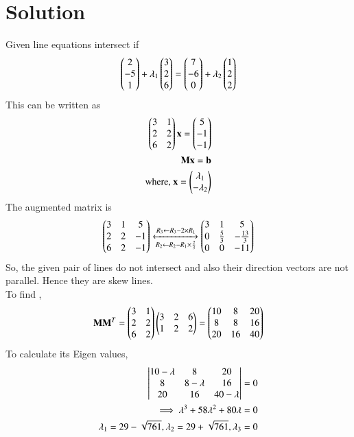 \documentclass[journal,12pt,twocolumn]{IEEEtran}
\begin{document}
\section{Solution}
Given line equations intersect if
\begin{align}
 \begin{pmatrix}2\\-5\\1\end{pmatrix}+\lambda_1\begin{pmatrix}3\\2\\6\end{pmatrix}=\begin{pmatrix}7\\-6\\0\end{pmatrix}+\lambda_2\begin{pmatrix}1\\2\\2\end{pmatrix}
\end{align}
This can be written as 
\begin{align}
    \begin{pmatrix}3&1\\2&2\\6&2\end{pmatrix}\mathbf{x}=\begin{pmatrix}5\\-1\\-1\end{pmatrix}\\
    \mathbf{M}\mathbf{x}=\mathbf{b}\\
    \text{where, }\mathbf{x}=\begin{pmatrix}\lambda_1\\-\lambda_2\end{pmatrix}
\end{align}
The augmented matrix is 
\begin{align}
    \begin{pmatrix}3&1&5\\2&2&-1\\6&2&-1\end{pmatrix}\xleftrightarrow[R_2\leftarrow R_2-R_1\times \frac{2}{3}]{R_3\leftarrow R_3-2\times R_1}\begin{pmatrix}3&1&5\\0&\frac{5}{3}&-\frac{13}{3}\\0&0&-11\end{pmatrix}
\end{align}
So, the given pair of lines do not intersect and also their direction vectors are not parallel. Hence they are skew lines.\\
To find ,
\begin{align}
    \mathbf{M}\mathbf{M}^T= \begin{pmatrix}3&1\\2&2\\6&2\end{pmatrix}\begin{pmatrix}3&2&6\\1&2&2\end{pmatrix}=\begin{pmatrix}10&8&20\\8&8&16\\20&16&40\end{pmatrix}
    \end{align}
    To calculate its Eigen values,
    \begin{align}
    \begin{vmatrix}10-\lambda&8&20\\8&8-\lambda&16\\20&16&40-\lambda\end{vmatrix}=0\\
    \implies \lambda^3+58\lambda^2+80\lambda=0\\
    \lambda_1=29-\sqrt{761},\lambda_2=29+\sqrt{761},\lambda_3=0
\end{align}
\end{document}

